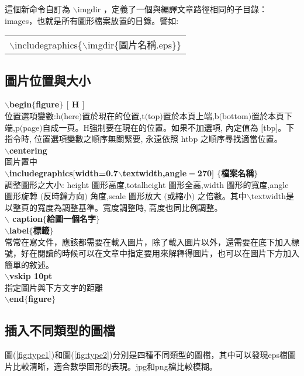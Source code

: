 這個新命令自訂為 {\A $\backslash$imgdir} ，定義了一個與編譯文章路徑相同的子目錄：images，也就是所有圖形檔案放置的目錄。譬如:

\smallskip
\begin{center}\colorbox{slight}{\begin{tabular}{p{}}
	{\A $\backslash$includegraphics\{$\backslash$imgdir\{圖片名稱.eps\}\}}
\smallskip\end{tabular}}\end{center}

\subsection{圖片位置與大小}

\textbf{$\backslash$begin$\lbrace$figure$\rbrace$ $[$ H $]$}\\
位置選項變數:h$($here$)$置於現在的位置,t$($top$)$置於本頁上端,b$($bottom$)$置於本頁下端,p$($page$)$自成一頁。H強制要在現在的位置。如果不加選項, 內定值為 $[$tbp$]$。下指令時, 位置選項變數之順序無關緊要, 永遠依照 htbp 之順序尋找適當位置。 \\
\textbf{$\backslash$centering} \\
圖片置中\\
\textbf{$\backslash$includegraphics$[$width=0.7$\backslash$textwidth,angle$=$270$]$ $\lbrace$檔案名稱$\rbrace$}\\
調整圖形之大小: height 圖形高度,totalheight 圖形全高,width 圖形的寬度,angle 圖形旋轉 $($反時鐘方向$)$ 角度,scale 圖形放大 $($或縮小$)$ 之倍數。其中$\backslash$textwidth是以整頁的寬度為調整基準。寬度調整時, 高度也同比例調整。\\
\textbf{$\backslash$ caption$\lbrace$給圖一個名字$\rbrace$} \\
\textbf{$\backslash$label$\lbrace$標籤$\rbrace$} \\
常常在寫文件，應該都需要在載入圖片，除了載入圖片以外，還需要在底下加入標號，好在閱讀的時候可以在文章中指定要用來解釋得圖片，也可以在圖片下方加入簡單的敘述。\\
\textbf{$\backslash$vskip 10pt} \\
指定圖片與下方文字的距離\\
\textbf{$\backslash$end$\lbrace$figure$\rbrace$}

\subsection{插入不同類型的圖檔}
圖(\ref{fig:type1})和圖(\ref{fig:type2})分別是四種不同類型的圖檔，其中可以發現eps檔圖片比較清晰，適合數學圖形的表現。jpg和png檔比較模糊。


